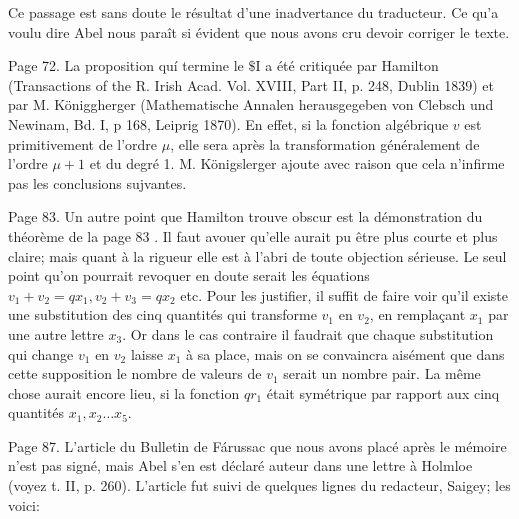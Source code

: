\documentclass{article}
\begin{document}
Ce passage est sans doute le résultat d'une inadvertance du traducteur. Ce qu'a voulu dire Abel nous paraît si évident que nous avons cru devoir corriger le texte.

Page 72. La proposition quí termine le \(\$ \mathrm{I}\) a été critiquée par Hamilton (Transactions of the R. Irish Acad. Vol. XVIII, Part II, p. 248, Dublin 1839) et par M. Königgherger (Mathematische Annalen herausgegeben von Clebsch und Newinam, Bd. I, p 168, Leiprig 1870). En effet, si la fonction algébrique \(v\) est primitivement de l'ordre \(\mu\), elle sera après la transformation généralement de l'ordre \(\mu+1\) et du degré 1. M. Königslerger ajoute avec raison que cela n'infirme pas les conclusions sujvantes.

Page 83. Un autre point que Hamilton trouve obscur est la démonstration du théorème de la page 83 . Il faut avouer qu'elle aurait pu être plus courte et plus claire; mais quant à la rigueur elle est à l'abri de toute objection sérieuse. Le seul point qu'on pourrait revoquer en doute serait les équations \(v_{1}+v_{2}=q x_{1}, v_{2}+v_{3}=q x_{2}\) etc. Pour les justifier, il suffit de faire voir qu'il existe une substitution des cinq quantités qui transforme \(v_{1}\) en \(v_{2}\), en remplaçant \(x_{1}\) par une autre lettre \(x_{3}\). Or dans le cas contraire il faudrait que chaque substitution qui change \(v_{1}\) en \(v_{2}\) laisse \(x_{1}\) à sa place, mais on se convaincra aisément que dans cette supposition le nombre de valeurs de \(v_{1}\) serait un nombre pair. La même chose aurait encore lieu, si la fonction \(q r_{1}\) était symétrique par rapport aux cinq quantités \(x_{1}, x_{2} \ldots x_{5}\).

Page 87. L'article du Bulletin de Fárussac que nous avons placé après le mémoire n'est pas signé, mais Abel s'en est déclaré auteur dans une lettre à Holmloe (voyez t. II, p. 260). L'article fut suivi de quelques lignes du redacteur, Saigey; les voici:
\end{document}
